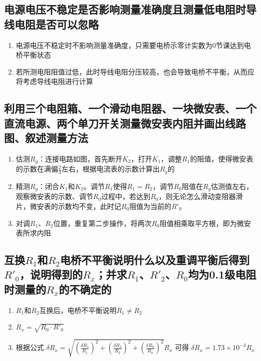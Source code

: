 \documentclass[UTF8]{ctexart}
\begin{document}
\subsection{电源电压不稳定是否影响测量准确度且测量低电阻时导线电阻是否可以忽略}
\begin{enumerate}
    \item 电源电压不稳定时不影响测量准确度，只需要电桥示零计实数为0节课达到电桥平衡状态
    \item 若所测电阻阻值过低，此时导线电阻分压较高，也会导致电桥不平衡，从而应将考虑导线电阻进行计算
\end{enumerate}

\subsection{利用三个电阻箱、一个滑动电阻器、一块微安表、一个直流电源、两个单刀开关测量微安表内阻并画出线路图、叙述测量方法}
\begin{enumerate}
    \item 估测$R_g$：连接电路如图，首先断开$K_2$，打开$K_1$，调整$R_1$的阻值，使得微安表的示数在满偏$\frac{2}{3}$左右，根据电流表的示数计算出$R_g$的
    \item 精测$R_g$：闭合$K_1$和$K_2$。调节$R_1$使得$R_1 = R_2$，调节$R_0$阻值在$R_g$估测值左右，观察微安表的示数、调节$R_0$过程中，若达到$R_0$，则无论怎么滑动变阻器滑片，微安表的示数均不变，此时记$R_0$阻值为当前的$R'_{0}$
    \item 对调$R_1$、$R_2$位置，重复第二步操作，将两次$R_0$阻值相乘取平方根，即为微安表所求内阻
\end{enumerate}


\vspace{4cm}
\subsection{互换$R_1$和$R_2$电桥不平衡说明什么以及重调平衡后得到$R'_0$，说明得到的$R_x$；并求$R_1$、$R'_2$、$R_0$均为0.1级电阻时测量的$R_x$的不确定的}
\begin{enumerate}
    \item $R_1$和$R_2$互换后，电桥不平衡说明$R_1 \ne R_2$
    \item $R_x = \sqrt{R_0 \cdot R'_0}$
    \item 根据公式 $\delta R_x   = \sqrt{\left( \frac{\delta R_1}{R_1}\right)^2 +
    \left( \frac{\delta R_2}{R_2}\right)^2  + \left( \frac{\delta R_0}{R_0}\right)^2 } R_x$ 可得 $\delta R_x = 1.73 \times 10^{-3} R_x$
\end{enumerate}
\end{document}
